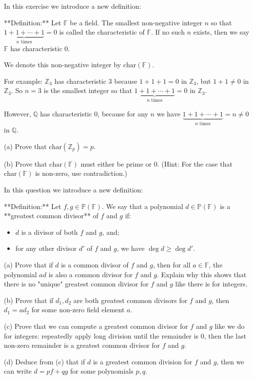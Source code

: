 \documentclass{article}
\theoremstyle{plain} %
\numberwithin{thm}{section} %
\theoremstyle{definition}
\begin{document}
    \begin{question}{6}
        In this exercise we introduce a new definition:

        **Definition:** Let \(\mathbb{F}\) be a field. The smallest non-negative integer \(n\) so that 
        \(\underbrace{1 + 1 + \cdots + 1}_{n \text{ times}} = 0\)
        is called the characteristic of \(\mathbb{F}\). If no such \(n\) exists, then we say \(\mathbb{F}\) has characteristic 0.

        We denote this non-negative integer by \(\text{char}(\mathbb{F})\).

        For example: \(\mathbb{Z}_3\) has characteristic 3 because \(1 + 1 + 1 = 0\) in \(\mathbb{Z}_3\), but \(1 + 1 \neq 0\) in \(\mathbb{Z}_3\).
        So \(n = 3\) is the smallest integer so that 
        \(\underbrace{1 + 1 + \cdots + 1}_{n \text{ times}} = 0\)
        in \(\mathbb{Z}_3\).

        However, \(\mathbb{Q}\) has characteristic 0, because for any \(n\) we have 
        \(\underbrace{1 + 1 + \cdots + 1}_{n \text{ times}} = n \neq 0\)
        in \(\mathbb{Q}\).

        (a) Prove that \(\text{char}(\mathbb{Z}_p) = p\).

        (b) Prove that \(\text{char}(\mathbb{F})\) must either be prime or 0. (Hint: For the case that \(\text{char}(\mathbb{F})\) is non-zero, use contradiction.)
    \end{question}
    \newpage
    \begin{question}{7}
        In this question we introduce a new definition:

        **Definition:** Let \(f, g \in \mathbb{P}(\mathbb{F})\). We say that a polynomial \(d \in \mathbb{P}(\mathbb{F})\) is a **greatest common divisor** of \(f\) and \(g\) if:

        \begin{itemize}
            \item \(d\) is a divisor of both \(f\) and \(g\), and;
            \item for any other divisor \(d'\) of \(f\) and \(g\), we have \(\deg d \geq \deg d'\).
        \end{itemize}

        (a) Prove that if \(d\) is a common divisor of \(f\) and \(g\), then for all \(a \in \mathbb{F}\), the polynomial \(ad\) is also a common divisor for \(f\) and \(g\). Explain why this shows that there is no "unique" greatest common divisor for \(f\) and \(g\) like there is for integers.

        (b) Prove that if \(d_1, d_2\) are both greatest common divisors for \(f\) and \(g\), then \(d_1 = ad_2\) for some non-zero field element \(a\).

        (c) Prove that we can compute a greatest common divisor for \(f\) and \(g\) like we do for integers: repeatedly apply long division until the remainder is 0, then the last non-zero remainder is a greatest common divisor for \(f\) and \(g\).

        (d) Deduce from (c) that if \(d\) is a greatest common division for \(f\) and \(g\), then we can write \(d = pf + qg\) for some polynomials \(p, q\).

    \end{question}
\end{document}
